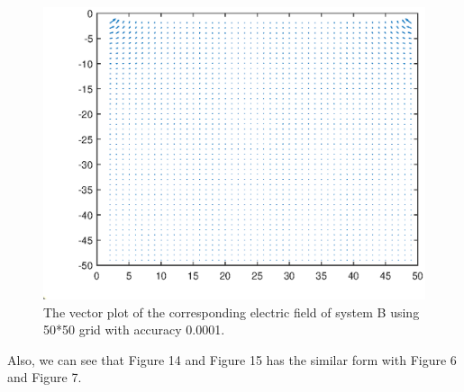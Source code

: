 \documentclass[12pt]{report}
\begin{document}
\begin{figure}[H]
    \centering
    \includegraphics[width=0.8\linewidth]{B00001Vector.eps}
    \caption{The vector plot of the corresponding electric field of system B using 50*50 grid with accuracy 0.0001.}
\end{figure}
Also, we can see that Figure 14 and Figure 15 has the similar form with Figure 6 and Figure 7.
\end{document}
